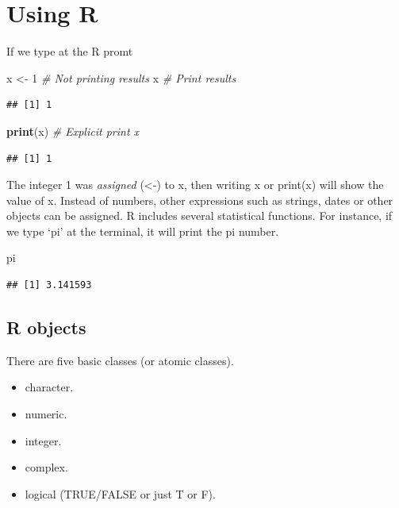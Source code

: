 \documentclass[12pt,graybox,envcountchap,sectrefs]{krantz}
\makeatletter
\newenvironment{Shaded}{\begin{snugshade}}{\end{snugshade}}
\newcommand{\KeywordTok}[1]{\textcolor[rgb]{0.13,0.29,0.53}{\textbf{#1}}}
\newcommand{\DecValTok}[1]{\textcolor[rgb]{0.00,0.00,0.81}{#1}}
\newcommand{\StringTok}[1]{\textcolor[rgb]{0.31,0.60,0.02}{#1}}
\newcommand{\CommentTok}[1]{\textcolor[rgb]{0.56,0.35,0.01}{\textit{#1}}}
\newcommand{\NormalTok}[1]{#1}
\providecommand{\tightlist}{%
  \setlength{\itemsep}{0pt}\setlength{\parskip}{0pt}}
\newenvironment{kframe}{%
\medskip{}
\setlength{\fboxsep}{.8em}
 \def\at@end@of@kframe{}%
 \ifinner\ifhmode%
  \def\at@end@of@kframe{\end{minipage}}%
  \begin{minipage}{\columnwidth}%
 \fi\fi%
 \def\FrameCommand##1{\hskip\@totalleftmargin \hskip-\fboxsep
 \colorbox{shadecolor}{##1}\hskip-\fboxsep
     \hskip-\linewidth \hskip-\@totalleftmargin \hskip\columnwidth}%
 \MakeFramed {\advance\hsize-\width
   \@totalleftmargin\z@ \linewidth\hsize
   \@setminipage}}%
 {\par\unskip\endMakeFramed%
 \at@end@of@kframe}
\renewenvironment{Shaded}{\begin{kframe}}{\end{kframe}}
\theoremstyle{definition}
\theoremstyle{definition}
\theoremstyle{definition}
\theoremstyle{remark}
\makeatother
\begin{document}
\section{Using R}\label{using-r}

If we type at the R promt

\begin{Shaded}
\begin{Highlighting}[]
\NormalTok{x <-}\StringTok{ }\DecValTok{1}   \CommentTok{# Not printing  results}
\NormalTok{x        }\CommentTok{# Print results}
\end{Highlighting}
\end{Shaded}

\begin{verbatim}
## [1] 1
\end{verbatim}

\begin{Shaded}
\begin{Highlighting}[]
\KeywordTok{print}\NormalTok{(x) }\CommentTok{# Explicit print x}
\end{Highlighting}
\end{Shaded}

\begin{verbatim}
## [1] 1
\end{verbatim}

The integer 1 was \emph{assigned} (\textless{}-) to x, then writing x or
print(x) will show the value of x. Instead of numbers, other expressions
such as strings, dates or other objects can be assigned. R includes
several statistical functions. For instance, if we type `pi' at the
terminal, it will print the pi number.

\begin{Shaded}
\begin{Highlighting}[]
\NormalTok{pi}
\end{Highlighting}
\end{Shaded}

\begin{verbatim}
## [1] 3.141593
\end{verbatim}

\subsection{R objects}\label{r-objects}

There are five basic classes (or atomic classes).

\begin{itemize}
\tightlist
\item
  character.
\item
  numeric.
\item
  integer.
\item
  complex.
\item
  logical (TRUE/FALSE or just T or F).
\end{itemize}
\end{document}
